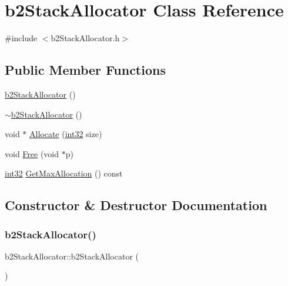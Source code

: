 \hypertarget{classb2_stack_allocator}{}\section{b2\+Stack\+Allocator Class Reference}
\label{classb2_stack_allocator}


{\ttfamily \#include $<$b2\+Stack\+Allocator.\+h$>$}

\subsection*{Public Member Functions}
\begin{DoxyCompactItemize}
\item 
\mbox{\hyperlink{classb2_stack_allocator_a00f8771300fe1efeb6fbaab489a8dd0a}{b2\+Stack\+Allocator}} ()
\item 
\mbox{\hyperlink{classb2_stack_allocator_a9f9bd23569d3521316d2f00b1de454b2}{$\sim$b2\+Stack\+Allocator}} ()
\item 
void $\ast$ \mbox{\hyperlink{classb2_stack_allocator_a4b8c515d8e1a1c2d5b151c3a2f96fa19}{Allocate}} (\mbox{\hyperlink{b2_settings_8h_a43d43196463bde49cb067f5c20ab8481}{int32}} size)
\item 
void \mbox{\hyperlink{classb2_stack_allocator_a3a4384cf5f467828db3022985673db66}{Free}} (void $\ast$p)
\item 
\mbox{\hyperlink{b2_settings_8h_a43d43196463bde49cb067f5c20ab8481}{int32}} \mbox{\hyperlink{classb2_stack_allocator_a9670b9ce67f939004f227d1be883404f}{Get\+Max\+Allocation}} () const
\end{DoxyCompactItemize}


\subsection{Constructor \& Destructor Documentation}
\mbox{\label{classb2_stack_allocator_a00f8771300fe1efeb6fbaab489a8dd0a}} 
\subsubsection{\texorpdfstring{b2StackAllocator()}{b2StackAllocator()}}
{\footnotesize\ttfamily b2\+Stack\+Allocator\+::b2\+Stack\+Allocator (\begin{DoxyParamCaption}{ }\end{DoxyParamCaption})}

